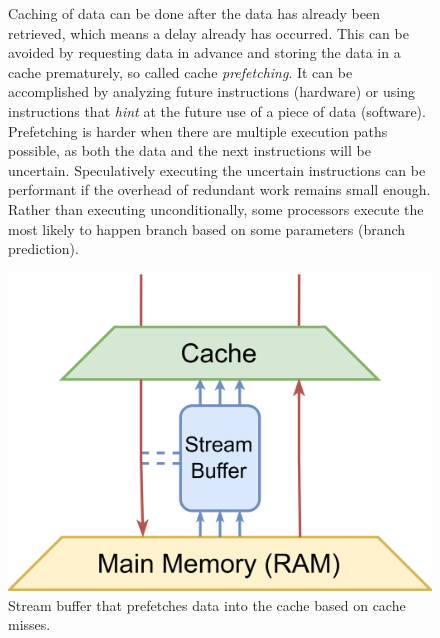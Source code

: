 \documentclass{article}
\begin{document}
\begin{figure}[ht]
\begin{minipage}{.65\textwidth}
Caching of data can be done after the data has already been retrieved, which means a delay already has occurred.
This can be avoided by requesting data in advance and storing the data in a cache prematurely, so called cache {\it prefetching}.
It can be accomplished by analyzing future instructions (hardware) or using instructions that {\it hint} at the future use of a piece of data (software)\cite{cache-prefetching}.
Prefetching is harder when there are multiple execution paths possible, as both the data and the next instructions will be uncertain.
Speculatively executing the uncertain instructions can be performant if the overhead of redundant work remains small enough.
Rather than executing unconditionally, some processors execute the most likely to happen branch based on some parameters (branch prediction)\cite{instruction-level-parallelism}.
\end{minipage}%
\begin{minipage}{.35\textwidth}
    \centering
    \includegraphics[scale=0.08]{cache (2).png}
    \captionsetup{margin=0.5cm}
    \captionsetup{format=plain}
    \caption{Stream buffer that prefetches data into the cache based on cache misses.}
\end{minipage}
\end{figure}
\vspace{-1.5em}
\end{document}
